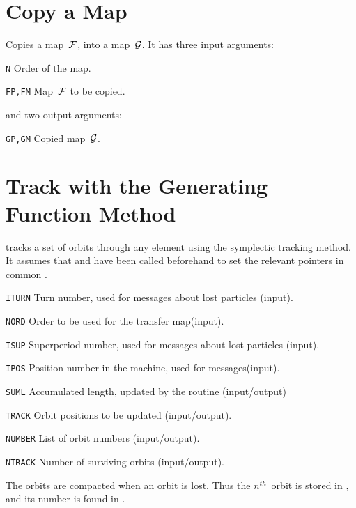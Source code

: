 \section{Copy a Map}
\label{LMCOPY}
Copies a map~$\cal F$, into a map~$\cal G$.
It has three input arguments:
\begin{mylist}
\item[\tt N]
Order of the map.
\item[\tt FP,FM]
Map~$\cal F$ to be copied.
\end{mylist}
and two output arguments:
\begin{mylist}
\item[\tt GP,GM]
Copied map~$\cal G$.
\end{mylist}
 
\section{Track with the Generating Function Method}
\label{LMELEM}
tracks a set of orbits through any element using the symplectic
tracking method.
It assumes that  and  have been called
beforehand to set the relevant pointers in common .
\begin{mylist}
\item[\tt ITURN]
Turn number, used for messages about lost particles (input).
\item[\tt NORD]
Order to be used for the transfer map(input).
\item[\tt ISUP]
Superperiod number, used for messages about lost particles (input).
\item[\tt IPOS]
Position number in the machine, used for messages(input).
\item[\tt SUML]
Accumulated length, updated by the routine (input/output)
\item[\tt TRACK]
Orbit positions to be updated (input/output).
\item[\tt NUMBER]
List of orbit numbers (input/output).
\item[\tt NTRACK]
Number of surviving orbits (input/output).
\end{mylist}
The orbits are compacted when an orbit is lost.
Thus the $n^{th}$~orbit is stored in ,
and its number is found in .
 
